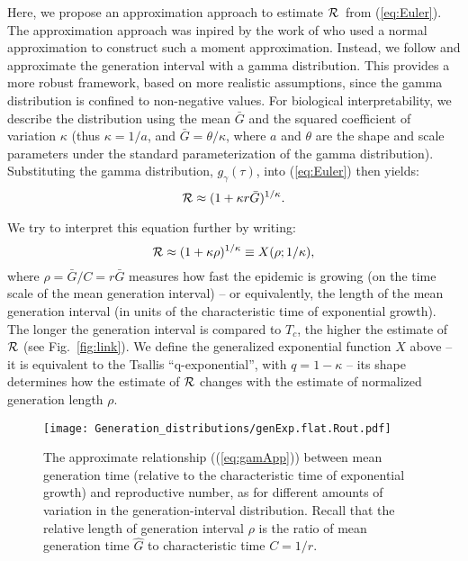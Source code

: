 \documentclass[12pt,]{article}
\newcommand{\RR}{\ensuremath{{\cal R}}}
\newcommand{\Tc}{\ensuremath{C}}
\newcommand{\eref}[1]{(\ref{eq:#1})}
\newcommand{\fref}[1]{Fig.~\ref{fig:#1}}
\begin{document}
Here, we propose an approximation approach to estimate \RR\ from \eref{Euler}. 
The approximation approach was inpired by the work of \cite{WallLips07} who used a normal approximation to construct such a moment approximation. 
Instead, we follow \cite{NishCast09} and approximate the generation interval with a gamma distribution.
This provides a more robust framework, based on more realistic assumptions, since the gamma distribution is confined to non-negative values. 
For biological interpretability, we describe the distribution using the mean $\bar G$ and the squared coefficient of variation $\kappa$ (thus $\kappa = 1/a$, and $\bar G = \theta/\kappa$, where $a$ and $\theta$ are the shape and scale parameters under the standard parameterization of the gamma distribution).
Substituting the gamma distribution, $g_{\gamma}(\tau)$, into \eref{Euler} then yields:
\begin{equation}
	\RR \approx (1 + \kappa r \bar G)^{1/\kappa}.
	\label{eq:gamApp}
\end{equation}

We try to interpret this equation further by writing:
\begin{equation}
	\RR \approx (1 + \kappa \rho)^{1/\kappa} \equiv X(\rho; 1/\kappa),
	\label{eq:genExp}
\end{equation}
where $\rho = \bar G/\Tc = r\bar G$ measures how fast the epidemic is growing (on the time scale of the mean generation interval) -- or equivalently, the length of the mean generation interval (in units of the characteristic time of exponential growth).
The longer the generation interval is compared to $T_c$, the higher the estimate of $\RR$ (see \fref{link}).
We define the generalized exponential function $X$ above -- it is equivalent to the Tsallis ``q-exponential'', with $q=1-\kappa$ \cite{tsallis1994numbers} -- its shape determines how the estimate of $\RR$ changes with the estimate of normalized generation length $\rho$.

\begin{figure}[htbp]
	\centering \texttt{[image: Generation\_distributions/genExp.flat.Rout.pdf]}
	\caption{
		The approximate relationship (\eref{gamApp}) between mean
		generation time (relative to the characteristic time of
		exponential growth) and reproductive number, as for different
		amounts of variation in the generation-interval
		distribution. 
		Recall that the 
		relative length of generation interval $\rho$ is the ratio of
		mean generation time $\hat G$ to characteristic time $C = 1/r$.
	} \label{fig:genExp} 
\end{figure}
\end{document}
